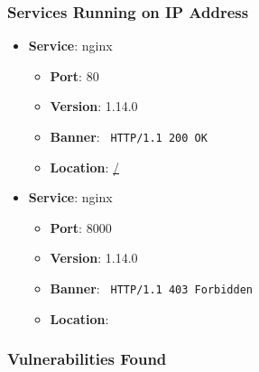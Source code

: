 \documentclass{article}
\begin{document}
\subsubsection*{Services Running on IP Address}

\begin{itemize}
    
        \item \textbf{Service}: nginx
        \begin{itemize}
            \item \textbf{Port}: 80
            \item \textbf{Version}:  1.14.0 
            \item \textbf{Banner}: \texttt{ HTTP/1.1 200 OK
 }
            \item \textbf{Location}: \href{ / }{ / }
        \end{itemize}
    
        \item \textbf{Service}: nginx
        \begin{itemize}
            \item \textbf{Port}: 8000
            \item \textbf{Version}:  1.14.0 
            \item \textbf{Banner}: \texttt{ HTTP/1.1 403 Forbidden
 }
            \item \textbf{Location}: \href{  }{  }
        \end{itemize}
    
\end{itemize}


\subsubsection*{Vulnerabilities Found}
\end{document}
